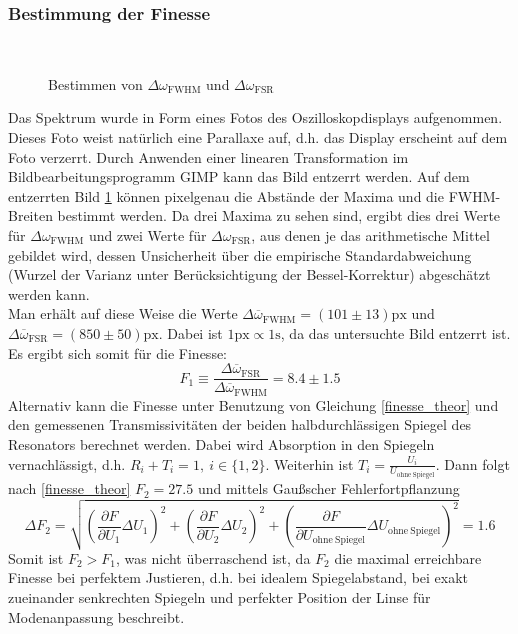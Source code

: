 \documentclass[11pt,a4paper,oneside]{scrartcl}
\begin{document}
\subsubsection{Bestimmung der Finesse}
\begin{figure}[H]
    \centering
  \\
   \caption{Bestimmen von $\Delta\omega_{\mathrm{FWHM}}$ und $\Delta\omega_{\mathrm{FSR}}$}
    \label{Bestimmen_Finesse_Fotostrecke}
\end{figure}
Das Spektrum wurde in Form eines Fotos des Oszilloskopdisplays aufgenommen. Dieses Foto weist natürlich eine Parallaxe auf, d.h. das Display erscheint auf dem Foto verzerrt. Durch Anwenden einer linearen Transformation im Bildbearbeitungsprogramm GIMP kann das Bild entzerrt werden. Auf dem entzerrten Bild \ref{Bestimmen_Finesse_Fotostrecke} können pixelgenau die Abstände der Maxima und die FWHM-Breiten bestimmt werden. Da drei Maxima zu sehen sind, ergibt dies drei Werte für $\Delta\omega_{\mathrm{FWHM}}$ und zwei Werte für $\Delta\omega_{\mathrm{FSR}}$, aus denen je das arithmetische Mittel gebildet wird, dessen Unsicherheit über die empirische Standardabweichung (Wurzel der Varianz unter Berücksichtigung der Bessel-Korrektur) abgeschätzt werden kann.\\
Man erhält auf diese Weise die Werte $\Delta\overline\omega_{\mathrm{FWHM}}=(101\pm13)\mathrm{px}$ und $\Delta\overline\omega_{\mathrm{FSR}}=(850\pm50)\mathrm{px}$. Dabei ist $1\mathrm{px}\propto 1\mathrm s$, da das untersuchte Bild entzerrt ist. \\
Es ergibt sich somit für die Finesse:
\begin{equation}
F_1\equiv \frac{\Delta\overline\omega_{\mathrm{FSR}}}{\Delta\overline\omega_{\mathrm{FWHM}}}=8.4\pm1.5
\end{equation}
Alternativ kann die Finesse unter Benutzung von Gleichung \ref{finesse_theor} und den gemessenen Transmissivitäten der beiden halbdurchlässigen Spiegel des Resonators berechnet werden. Dabei wird Absorption in den Spiegeln vernachlässigt, d.h. $R_i+T_i=1,\ i\in\{1,2\}$. Weiterhin ist $T_i=\frac{U_i}{U_{\mathrm{ohne}\ \mathrm{Spiegel}}}$. Dann folgt nach \ref{finesse_theor} $F_2=27.5$ und mittels Gaußscher Fehlerfortpflanzung \begin{equation}
\Delta F_2 = \sqrt{\left(\frac{\partial F}{\partial U_1}\Delta U_1\right)^2+\left(\frac{\partial F}{\partial U_2}\Delta U_2\right)^2+\left(\frac{\partial F}{\partial U_{\mathrm{ohne}\ \mathrm{Spiegel}}}\Delta U_{\mathrm{ohne}\ \mathrm{Spiegel}}\right)^2}=1.6
\end{equation}
Somit ist $F_2>F_1$, was nicht überraschend ist, da $F_2$ die maximal erreichbare Finesse bei perfektem Justieren, d.h. bei idealem Spiegelabstand, bei exakt zueinander senkrechten Spiegeln und perfekter Position der Linse für Modenanpassung beschreibt.
\end{document}
